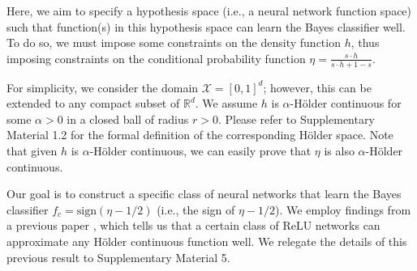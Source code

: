 \documentclass{article}
\def\RR{\mathbb R}
\begin{document}
Here, we aim to specify a hypothesis space (i.e., a neural network function space) such that function(s) in this hypothesis space can learn the Bayes classifier well. 
To do so, we must impose some constraints on the density function $h$, thus imposing constraints on the conditional probability function $\eta= \frac{s\cdot h}{s\cdot h+1-s} $. 

For simplicity, we consider the domain $\mathcal{X}=[0,1]^d$; however, this can be extended to any compact subset of $\RR^d$.  We assume $h$ is $\alpha$-Hölder continuous for some $\alpha>0$ in a closed ball of radius $r>0$. Please refer to Supplementary Material 1.2 for the formal definition of the corresponding Hölder space. Note that given $h$ is $\alpha$-Hölder continuous, we can easily prove that $\eta$ is also $\alpha$-Hölder continuous.


Our goal is to construct a specific class of neural networks that learn the Bayes classifier $f_c = \text{sign}\left(\eta - 1/2\right)$ (i.e., the sign of $\eta - 1/2$). 
We employ findings from a previous paper \citep{schmidt2020nonparametric}, which tells us that a certain class of ReLU networks can approximate any Hölder continuous function well. We relegate the details of this previous result to Supplementary Material 5. 
\end{document}
